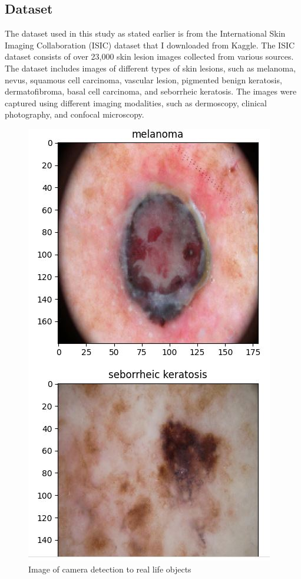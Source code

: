 \documentclass[twocolumn]{article}
\begin{document}
\subsection{Dataset}
The dataset used in this study as stated earlier is from the International Skin Imaging Collaboration (ISIC) dataset that I downloaded from Kaggle. The ISIC dataset consists of over 23,000 skin lesion images collected from various sources. The dataset includes images of different types of skin lesions, such as melanoma, nevus, squamous cell carcinoma, vascular lesion, pigmented benign keratosis, dermatofibroma, basal cell carcinoma, and seborrheic keratosis. The images were captured using different imaging modalities, such as dermoscopy, clinical photography, and confocal microscopy.
\begin{figure}
  \includegraphics[width=\textwidth]{dataseet.jpg}
  \caption{Image of camera detection to real life objects}
  \label{fig: Sample dataset}
\end{figure}
\end{document}
